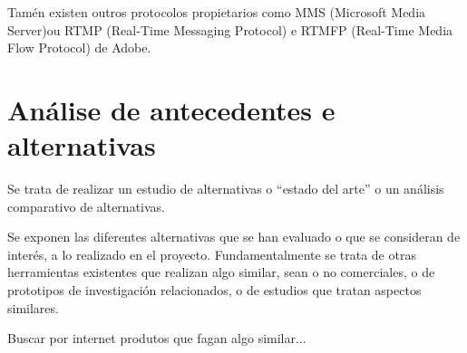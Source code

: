 		Tamén existen outros protocolos propietarios como MMS (Microsoft Media Server)ou RTMP 
		(Real-Time Messaging Protocol) e RTMFP (Real-Time Media Flow Protocol) de Adobe.
  
\chapter{Análise de antecedentes e alternativas}
	Se trata de realizar un estudio de alternativas o “estado del arte” o un análisis comparativo
	de alternativas.

	Se exponen las diferentes alternativas que se han evaluado o que se consideran de interés, a
	lo realizado en el proyecto. Fundamentalmente se trata de otras herramientas existentes 
	que realizan algo similar, sean o no comerciales, o de prototipos de investigación relacionados,
	o de estudios que tratan aspectos similares.

	Buscar por internet produtos que fagan algo similar...